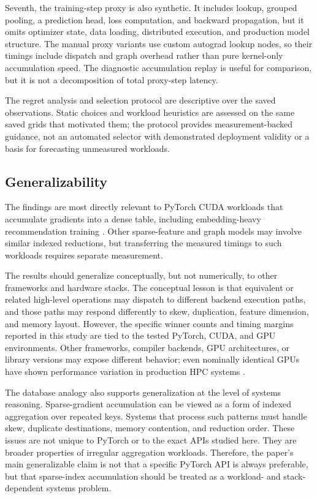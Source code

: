 Seventh, the training-step proxy is also synthetic. It includes lookup, grouped pooling, a prediction head, loss computation, and backward propagation, but it omits optimizer state, data loading, distributed execution, and production model structure. The manual proxy variants use custom autograd lookup nodes, so their timings include dispatch and graph overhead rather than pure kernel-only accumulation speed. The diagnostic accumulation replay is useful for comparison, but it is not a decomposition of total proxy-step latency.

The regret analysis and selection protocol are descriptive over the saved observations. Static choices and workload heuristics are assessed on the same saved grids that motivated them; the protocol provides measurement-backed guidance, not an automated selector with demonstrated deployment validity or a basis for forecasting unmeasured workloads.

\subsection{Generalizability}

The findings are most directly relevant to PyTorch CUDA workloads that accumulate gradients into a dense table, including embedding-heavy recommendation training \citep{naumov2019dlrm,acun2021training}. Other sparse-feature and graph models may involve similar indexed reductions, but transferring the measured timings to such workloads requires separate measurement.

The results should generalize conceptually, but not numerically, to other frameworks and hardware stacks. The conceptual lesson is that equivalent or related high-level operations may dispatch to different backend execution paths, and those paths may respond differently to skew, duplication, feature dimension, and memory layout. However, the specific winner counts and timing margins reported in this study are tied to the tested PyTorch, CUDA, and GPU environments. Other frameworks, compiler backends, GPU architectures, or library versions may expose different behavior; even nominally identical GPUs have shown performance variation in production HPC systems \citep{sinha2022variability}.

The database analogy also supports generalization at the level of systems reasoning. Sparse-gradient accumulation can be viewed as a form of indexed aggregation over repeated keys. Systems that process such patterns must handle skew, duplicate destinations, memory contention, and reduction order. These issues are not unique to PyTorch or to the exact APIs studied here. They are broader properties of irregular aggregation workloads. Therefore, the paper's main generalizable claim is not that a specific PyTorch API is always preferable, but that sparse-index accumulation should be treated as a workload- and stack-dependent systems problem.

